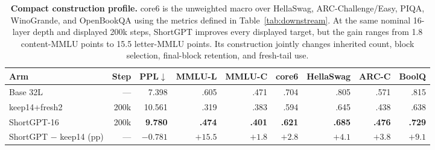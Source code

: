 \begin{table}[t]
\centering
\scriptsize
\setlength{\tabcolsep}{4.0pt}
\begin{tabular}{@{}lrrrrrrrr@{}}
\toprule
\textbf{Arm} & \textbf{Step} & \textbf{PPL}$\downarrow$ &
\textbf{MMLU-L} & \textbf{MMLU-C} & \textbf{core6} &
\textbf{HellaSwag} & \textbf{ARC-C} & \textbf{BoolQ} \\
\midrule
Base 32L & --- & 7.398 & .605 & .471 & .704 & .805 & .571 & .815 \\
keep14+fresh2 & 200k & 10.561 & .319 & .383 & .594 & .645 & .438 & .638 \\
ShortGPT-16 & 200k & \textbf{9.780} & \textbf{.474} & \textbf{.401} &
\textbf{.621} & \textbf{.685} & \textbf{.476} & \textbf{.729} \\
\midrule
ShortGPT $-$ keep14 (pp) & --- & $-0.781$ & $+15.5$ & $+1.8$ &
$+2.8$ & $+4.1$ & $+3.8$ & $+9.1$ \\
\bottomrule
\end{tabular}
\caption{\textbf{Compact construction profile.} core6 is the unweighted macro
over HellaSwag, ARC-Challenge/Easy, PIQA, WinoGrande, and OpenBookQA using the
metrics defined in Table~\ref{tab:downstream}. At the same nominal
16-layer depth and displayed 200k steps, ShortGPT improves every displayed
target, but the gain ranges from 1.8 content-MMLU points to 15.5 letter-MMLU
points. Its construction jointly changes inherited count, block selection,
final-block retention, and fresh-tail use.}
\label{tab:policy-endpoint}
\end{table}
